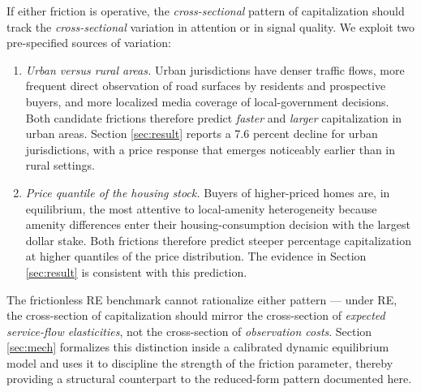 If either friction is operative, the {\it cross-sectional} pattern of capitalization should track the {\it cross-sectional} variation in attention or in signal quality. We exploit two pre-specified sources of variation:

\begin{enumerate}
\item {\it Urban versus rural areas.} Urban jurisdictions have denser traffic flows, more frequent direct observation of road surfaces by residents and prospective buyers, and more localized media coverage of local-government decisions. Both candidate frictions therefore predict {\it faster} and {\it larger} capitalization in urban areas. Section \ref{sec:result} reports a 7.6 percent decline for urban jurisdictions, with a price response that emerges noticeably earlier than in rural settings.

\item {\it Price quantile of the housing stock.} Buyers of higher-priced homes are, in equilibrium, the most attentive to local-amenity heterogeneity because amenity differences enter their housing-consumption decision with the largest dollar stake. Both frictions therefore predict steeper percentage capitalization at higher quantiles of the price distribution. The evidence in Section \ref{sec:result} is consistent with this prediction.
\end{enumerate}

The frictionless RE benchmark cannot rationalize either pattern --- under RE, the cross-section of capitalization should mirror the cross-section of {\it expected service-flow elasticities}, not the cross-section of {\it observation costs}. Section \ref{sec:mech} formalizes this distinction inside a calibrated dynamic equilibrium model and uses it to discipline the strength of the friction parameter, thereby providing a structural counterpart to the reduced-form pattern documented here.